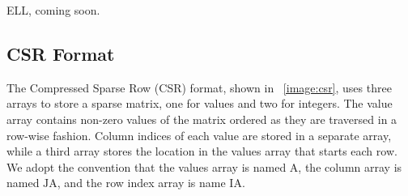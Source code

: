 \documentclass[11pt,conference]{IEEEtran}
\begin{document}
ELL, coming soon.

\subsection{CSR Format}

The Compressed Sparse Row (CSR) format, shown in \figurename~\ref{image:csr}, uses three arrays to store a sparse matrix, one for values and two for integers.  The value array contains non-zero values of the matrix ordered as they are traversed in a row-wise fashion.  Column indices of each value are stored in a separate array, while a third array stores the location in the values array that starts each row.  We adopt the convention that the values array is named $\mathrm{A}$, the column array is named $\mathrm{JA}$, and the row index array is name $\mathrm{IA}$.
\end{document}
